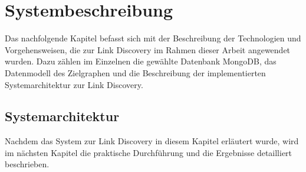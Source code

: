 \chapter{Systembeschreibung}
\label{system}

Das nachfolgende Kapitel befasst sich mit der Beschreibung der Technologien und Vorgehensweisen, die zur Link Discovery im Rahmen dieser Arbeit angewendet wurden. Dazu zählen im Einzelnen die gewählte Datenbank MongoDB, das Datenmodell des Zielgraphen und die Beschreibung der implementierten Systemarchitektur zur Link Discovery.


\section{Systemarchitektur}


Nachdem das System zur Link Discovery in diesem Kapitel erläutert wurde, wird im nächsten Kapitel die praktische Durchführung und die Ergebnisse detailliert beschrieben.